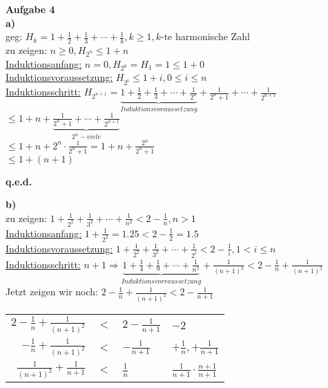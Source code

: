 \documentclass[a4paper]{scrartcl}
\begin{document}
	\begin{flushleft}
		\textbf{Aufgabe 4}\\
		\textbf{a)}\\
		geg: $H_k=1+\frac{1}{2}+\frac{1}{3}+\cdots +\frac{1}{k}, k\ge 1, k$-te harmonische Zahl\\
		zu zeigen: $n\ge 0, H_{2^n}\le 1+n$\\[1em]
		\underline{Induktionsanfang:} $n=0, H_{2^0} = H_{1} = 1\le 1 + 0$\\ 
		\underline{Induktionsvoraussetzung:} $H_{2^i}\le 1+i, 0\le i \le n$\\
		\underline{Induktionsschritt:} $H_{2^{n+1}}= \underbrace{1+\frac{1}{2}+\frac{1}{3}+\cdots +\frac{1}{2^n}}_{Induktionsvoraussetzung}+\frac{1}{2^n+1}+\cdots +\frac{1}{2^{n+1}}$\\
		$\le 1+n+\underbrace{\frac{1}{2^n+1}+\cdots +\frac{1}{2^{n+1}}}_{2^n-viele}$\\
		$\le 1+n+2^n\cdot \frac{1}{2^n+1} = 1+n+\frac{2^n}{2^n+1}$\\
		$\le 1+(n+1)$\\
		\begin{center}
		\textbf{q.e.d.}\\
		\end{center}
		\textbf{b)}\\
		zu zeigen: $1+\frac{1}{2^2}+\frac{1}{3^2}+\cdots +\frac{1}{n^2} < 2-\frac{1}{n}, n>1$\\
		\underline{Induktionsanfang:} $1+\frac{1}{2^2} = 1.25 < 2 - \frac{1}{2} = 1.5$\\
		\underline{Induktionsvoraussetzung:} $1+\frac{1}{2^2}+\frac{1}{3^2}+\cdots +\frac{1}{2^i} < 2-\frac{1}{i}, 1< i \le n$\\
		\underline{Induktionsschritt:} $n+1 \Rightarrow \underbrace{1+\frac{1}{4}+\frac{1}{9}+\cdots +\frac{1}{n^2}}_{Induktionsvorraussetzung}+\frac{1}{(n+1)^2}< 2-\frac{1}{n}+\frac{1}{(n+1)^2}$\\[1em]
		Jetzt zeigen wir noch: $2-\frac{1}{n}+\frac{1}{(n+1)^2} < 2 - \frac{1}{n+1}$\\
		\begin{center}
		\begin{tabular}{rcl | l}
		$2-\frac{1}{n}+\frac{1}{(n+1)^2}$ & $<$ & $2 - \frac{1}{n+1}$ & $-2$\\
		$-\frac{1}{n}+\frac{1}{(n+1)^2}$ & $<$ & $-\frac{1}{n+1}$ & $+\frac{1}{n}, +\frac{1}{n+1}$\\
		$\frac{1}{(n+1)^2}+\frac{1}{n+1}$ & $<$ & $\frac{1}{n}$ & $\frac{1}{n+1} \cdot \frac{n+1}{n+1}$\\

\end{tabular}
\end{center}
\end{flushleft}
\end{document}
